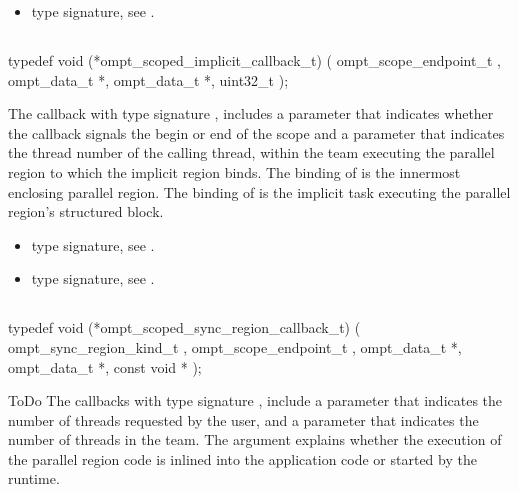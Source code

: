 \crossreferences
\begin{itemize}
\item {} type signature, see
.
\end{itemize}



\subsection{}
\label{subsec:ompt_scoped_implicit_callback_t}
\format
\begin{boxedcode}
typedef void (*ompt\_scoped\_implicit\_callback\_t) (
  ompt\_scope\_endpoint\_t ,
  ompt\_data\_t *,
  ompt\_data\_t *,
  uint32\_t 
);
\end{boxedcode}
\descr
The callback with type signature ,
includes a parameter  that indicates whether the callback signals
the begin or end of the scope and a parameter  that indicates
the thread number of the calling thread, within the team executing the parallel
region to which the implicit region binds.
The binding of  is the innermost enclosing parallel region.
The binding of  is the implicit task executing the parallel
region's structured block.


\crossreferences
\begin{itemize}
\item {} type signature, see
.
\item {} type signature, see
.
\end{itemize}



\subsection{}
\label{subsec:ompt_scoped_sync_region_callback_t}
\format
\begin{boxedcode}
typedef void (*ompt\_scoped\_sync\_region\_callback\_t) (
  ompt\_sync\_region\_kind\_t ,
  ompt\_scope\_endpoint\_t ,
  ompt\_data\_t *,
  ompt\_data\_t *,
  const void *
);
\end{boxedcode}
\descr ToDo
The callbacks with type signature ,
include a parameter 
that indicates the number of threads requested by the user, and a parameter
 that indicates the number of threads in the team.
The  argument explains whether the execution of the parallel
region code is inlined into the application code or started by the runtime.

